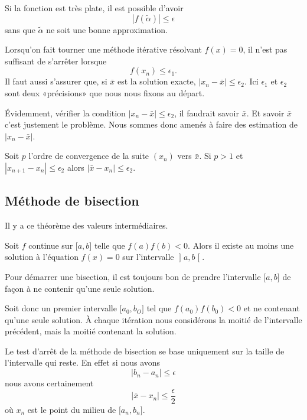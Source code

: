 \begin{normaltext}
	Si la fonction est très plate, il est possible d'avoir
	\begin{equation}
		| f(\tilde \alpha) |\leq \epsilon
	\end{equation}
	sans que \( \tilde \alpha\) ne soit une bonne approximation.

	Lorsqu'on fait tourner une méthode itérative résolvant \( f(x)=0\), il n'est pas suffisant de s'arrêter lorsque
	\begin{equation}
		f(x_n)\leq \epsilon_1.
	\end{equation}
	Il faut aussi s'assurer que, si \( \bar x\) est la solution exacte, \( | x_n-\bar x |\leq \epsilon_2\). Ici \( \epsilon_1\) et \( \epsilon_2\) sont deux «précisions» que nous nous fixons au départ.

	Évidemment, vérifier la condition \( | x_n-\bar x |\leq \epsilon_2\), il faudrait savoir \( \bar x\). Et savoir \( \bar x\) c'est justement le problème. Nous sommes donc amenés à faire des estimation de \( | x_n-\bar x |\).
\end{normaltext}

Soit \( p\) l'ordre de convergence de la suite \( (x_n)\) vers \( \bar x\). Si \( p>1\) et \( | x_{n+1}-x_n |\leq \epsilon_2\) alors \( | \bar x-x_n |\leq \epsilon_2\).

\subsection{Méthode de bisection}

Il y a ce théorème des valeurs intermédiaires.
\begin{theorem}
	Soit \( f\) continue sur \( \mathopen[ a , b \mathclose]\) telle que \( f(a)f(b)<0\). Alors il existe au moins une solution à l'équation \( f(x)=0\) sur l'intervalle \( \mathopen] a , b \mathclose[\).
\end{theorem}

Pour démarrer une bisection, il est toujours bon de prendre l'intervalle \( \mathopen[ a , b \mathclose]\) de façon à ne contenir qu'une seule solution.

Soit donc un premier intervalle \( \mathopen[ a_0 , b_O \mathclose]\) tel que \( f(a_0)f(b_0)<0\) et ne contenant qu'une seule solution. À chaque itération nous considérons la moitié de l'intervalle précédent, mais la moitié contenant la solution.

Le test d'arrêt de la méthode de bisection se base uniquement sur la taille de l'intervalle qui reste. En effet si nous avons
\begin{equation}
	| b_n-a_n |\leq \epsilon
\end{equation}
nous avons certainement
\begin{equation}
	| \bar x-x_n |\leq \frac{ \epsilon }{2}
\end{equation}
où \( x_n\) est le point du milieu de \( \mathopen[ a_n , b_n \mathclose]\).

